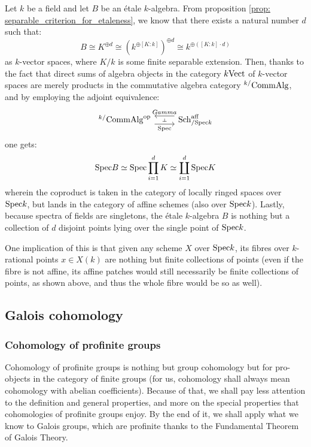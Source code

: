             \begin{remark} \label{remark: fibres_of_etale_maps_over_points}
                Let $k$ be a field and let $B$ be an \'etale $k$-algebra. From proposition \ref{prop: separable_criterion_for_etaleness}, we know that there exists a natural number $d$ such that:
                    $$B \cong K^{\oplus d} \cong (k^{\oplus [K : k]})^{\oplus d} \cong k^{\oplus ([K : k] \cdot d)}$$
                as $k$-vector spaces, where $K/k$ is some finite separable extension. Then, thanks to the fact that direct sums of algebra objects in the category $k\mathrm{Vect}$ of $k$-vector spaces are merely products in the commutative algebra category ${}^{k/}\mathrm{Comm}\mathrm{Alg}$, and by employing the adjoint equivalence:
                    $$
                        \begin{tikzcd}
                        	{{}^{k/}\Comm\Alg^{\op}} & {\Sch^{\aff}_{/\Spec k}}
                        	\arrow[""{name=0, anchor=center, inner sep=0}, "\Spec"', shift right=2, from=1-1, to=1-2]
                        	\arrow[""{name=1, anchor=center, inner sep=0}, "Gamma"', shift right=2, from=1-2, to=1-1]
                        	\arrow["\dashv"{anchor=center, rotate=-90}, draw=none, from=1, to=0]
                        \end{tikzcd}
                    $$
                one gets:
                    $$\mathrm{Spec} B \simeq \mathrm{Spec} \prod_{i = 1}^d K \simeq \coprod_{i = 1}^d \mathrm{Spec} K$$
                wherein the coproduct is taken in the category of locally ringed spaces over $\mathrm{Spec} k$, but lands in the category of affine schemes (also over $\mathrm{Spec} k$). Lastly, because spectra of fields are singletons, the \'etale $k$-algebra $B$ is nothing but a collection of $d$ disjoint points lying over the single point of $\mathrm{Spec} k$. 
                
                One implication of this is that given any scheme $X$ over $\mathrm{Spec} k$, its fibres over $k$-rational points $x \in X(k)$ are nothing but finite collections of points (even if the fibre is not affine, its affine patches would still necessarily be finite collections of points, as shown above, and thus the whole fibre would be so as well).
            \end{remark}
    
        \subsection{Galois cohomology}
            \subsubsection{Cohomology of profinite groups}
                Cohomology of profinite groups is nothing but group cohomology but for pro-objects in the category of finite groups (for us, cohomology shall always mean cohomology with abelian coefficients). Because of that, we shall pay less attention to the definition and general properties, and more on the special properties that cohomologies of profinite groups enjoy. By the end of it, we shall apply what we know to Galois groups, which are profinite thanks to the Fundamental Theorem of Galois Theory. 
                
